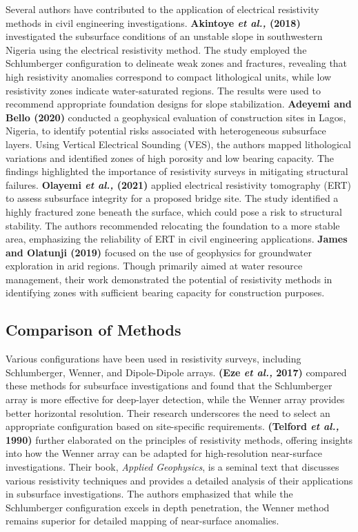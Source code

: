 \documentclass[12pt,a4paper]{report}
\begin{document}
Several authors have contributed to the application of electrical resistivity methods in civil engineering investigations. \textbf{Akintoye \textit{et al.,} (2018)} investigated the subsurface conditions of an unstable slope in southwestern Nigeria using the electrical resistivity method. The study employed the Schlumberger configuration to delineate weak zones and fractures, revealing that high resistivity anomalies correspond to compact lithological units, while low resistivity zones indicate water-saturated regions. The results were used to recommend appropriate foundation designs for slope stabilization. \textbf{Adeyemi and Bello (2020)} conducted a geophysical evaluation of construction sites in Lagos, Nigeria, to identify potential risks associated with heterogeneous subsurface layers. Using Vertical Electrical Sounding (VES), the authors mapped lithological variations and identified zones of high porosity and low bearing capacity. The findings highlighted the importance of resistivity surveys in mitigating structural failures. \textbf{Olayemi \textit{et al.,} (2021)} applied electrical resistivity tomography (ERT) to assess subsurface integrity for a proposed bridge site. The study identified a highly fractured zone beneath the surface, which could pose a risk to structural stability. The authors recommended relocating the foundation to a more stable area, emphasizing the reliability of ERT in civil engineering applications. \textbf{James and Olatunji (2019)} focused on the use of geophysics for groundwater exploration in arid regions. Though primarily aimed at water resource management, their work demonstrated the potential of resistivity methods in identifying zones with sufficient bearing capacity for construction purposes.

\subsection{Comparison of Methods}
Various configurations have been used in resistivity surveys, including Schlumberger, Wenner, and Dipole-Dipole arrays. \textbf{(Eze \textit{et al.,} 2017)} compared these methods for subsurface investigations and found that the Schlumberger array is more effective for deep-layer detection, while the Wenner array provides better horizontal resolution. Their research underscores the need to select an appropriate configuration based on site-specific requirements. \textbf{(Telford \textit{et al.,} 1990)} further elaborated on the principles of resistivity methods, offering insights into how the Wenner array can be adapted for high-resolution near-surface investigations. Their book, \textit{Applied Geophysics}, is a seminal text that discusses various resistivity techniques and provides a detailed analysis of their applications in subsurface investigations. The authors emphasized that while the Schlumberger configuration excels in depth penetration, the Wenner method remains superior for detailed mapping of near-surface anomalies.
\end{document}
